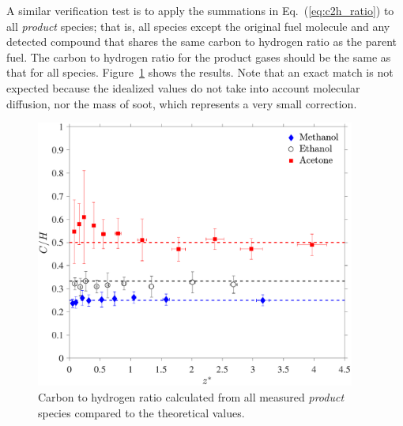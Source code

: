 \documentclass[12pt]{article}
\begin{document}
A similar verification test is to apply the summations in Eq.~(\ref{eq:c2h_ratio}) to all {\em product} species; that is, all species except the original fuel molecule and any detected compound that shares the same carbon to hydrogen ratio as the parent fuel. The carbon to hydrogen ratio for the product gases should be the same as that for all species. Figure~\ref{fig:SCR} shows the results. Note that an exact match is not expected because the idealized values do not take into account molecular diffusion, nor the mass of soot, which represents a very small correction.
\begin{figure}[h!]
	\centering
\includegraphics[width=10.5cm, keepaspectratio]{Prod_ratio_Comparison.pdf}
	\caption[Carbon to hydrogen ratio calculated from all {\em product} species]{Carbon to hydrogen ratio calculated from all measured {\em product} species compared to the theoretical values.}
	\label{fig:SCR}
\end{figure}
\end{document}
